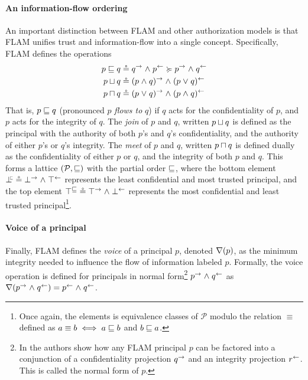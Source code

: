 \paragraph{An information-flow ordering}
An important distinction between FLAM and other authorization models is that FLAM unifies trust and information-flow into a single concept. Specifically, FLAM defines the operations
\begin{align*}
p \sqsubseteq q &\circeq q^{\rightarrow} \mathrel{\land} p^{\leftarrow} \succcurlyeq p^{\rightarrow} \mathrel{\land} q^{\leftarrow}\\
p \sqcup q &\circeq (p \mathrel{\land} q)^{\rightarrow} \mathrel{\land} (p \mathrel{\lor} q)^{\leftarrow} \\
p \sqcap q &\circeq (p \mathrel{\lor} q)^{\rightarrow} \mathrel{\land} (p \mathrel{\land} q)^{\leftarrow}
\end{align*}
That is, $p \sqsubseteq q$ (pronounced $p$ \emph{flows to} $q$) if $q$ acts for the confidentiality of $p$, and $p$ acts for the integrity of $q$. The \emph{join} of $p$ and $q$, written $p \sqcup q$ is defined as the principal with the authority of both $p$'s and $q$'s confidentiality, and the authority of either $p$'s or $q$'s integrity. The \emph{meet} of $p$ and $q$, written $p \sqcap q$ is defined dually as the confidentiality of either $p$ or $q$, and the integrity of both $p$ and $q$.
This forms a lattice $(\mathcal{P}, \sqsubseteq)$ with the partial order $\sqsubseteq$, where the bottom element $\botinfoflow \circeq \conf{\bot} \conj \integ{\top}$ represents the least confidential and most trusted principal, and the top element $\top^{\sqsubseteq} \circeq \top^{\rightarrow} \mathrel{\land} \bot^{\leftarrow}$ represents the most confidential and least trusted principal\footnote{Once again, the elements is equivalence classes of $\mathcal{P}$ modulo the relation $\equiv$ defined as $a \equiv b \iff a \sqsubseteq b$ and $b \sqsubseteq a$.}.

\paragraph{Voice of a principal}
Finally, FLAM defines the \emph{voice} of a principal $p$, denoted $\nabla(p)$, as the minimum integrity needed to influence the flow of information labeled $p$. Formally, the voice operation is defined for principals in normal form\footnote{In \cite{Arden:2015:FA:2859845.2859998} the authors show how any FLAM principal $p$ can be factored into a conjunction of a confidentiality projection $q^{\rightarrow}$ and an integrity projection $r^{\leftarrow}$. This is called the normal form of $p$.} $p^{\rightarrow} \mathrel{\land} q^{\leftarrow}$ as $\nabla(p^{\rightarrow} \mathrel{\land} q^{\leftarrow}) = p^{\leftarrow} \mathrel{\land} q^{\leftarrow}$.

